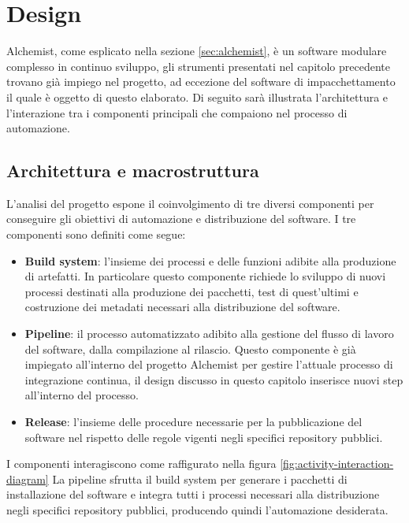 \chapter{Design}

Alchemist, come esplicato nella sezione \ref{sec:alchemist}, è un software modulare complesso in continuo sviluppo, gli strumenti presentati nel capitolo precedente trovano già impiego nel progetto, ad eccezione del software di impacchettamento il quale è oggetto di questo elaborato. Di seguito sarà illustrata l'architettura e l'interazione tra i componenti principali che compaiono nel processo di automazione.

\section{Architettura e macrostruttura}
L'analisi del progetto espone il coinvolgimento di tre diversi componenti per conseguire gli obiettivi di automazione e distribuzione del software. I tre componenti sono definiti come segue: 
\begin{itemize}
	\item \textbf{Build system}: l'insieme dei processi e delle funzioni adibite alla produzione di artefatti. In particolare questo componente richiede lo sviluppo di nuovi processi destinati alla produzione dei pacchetti, test di quest'ultimi e costruzione dei metadati necessari alla distribuzione del software.
	\item \textbf{Pipeline}: il processo automatizzato adibito alla gestione del flusso di lavoro del software, dalla compilazione al rilascio. Questo componente è già impiegato all'interno del progetto Alchemist per gestire l'attuale processo di integrazione continua, il design discusso in questo capitolo inserisce nuovi step all'interno del processo.
	\item \textbf{Release}: l'insieme delle procedure necessarie per la pubblicazione del software nel rispetto delle regole vigenti negli specifici repository pubblici.
\end{itemize}
I componenti interagiscono come raffigurato nella figura \ref{fig:activity-interaction-diagram} La pipeline sfrutta il build system per generare i pacchetti di installazione del software e integra tutti i processi necessari alla distribuzione negli specifici repository pubblici, producendo quindi l'automazione desiderata.

